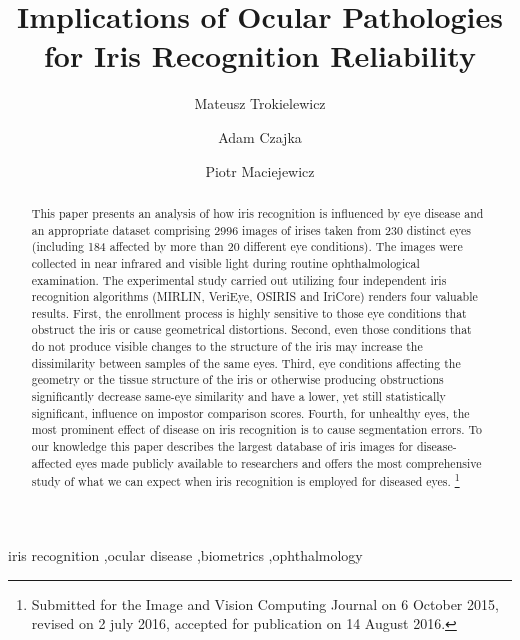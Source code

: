 \documentclass[article,12pt]{elsarticle}
\begin{document}
\begin{frontmatter}


\title{Implications of Ocular Pathologies \\for Iris Recognition Reliability}

\author[addressNASK,addressPW]{Mateusz Trokielewicz}

\author[addressNASK,addressPW]{Adam Czajka}

\author[addressWUM]{Piotr Maciejewicz}

\address[addressNASK]{Biometrics Laboratory, Research and Academic Computer Network (NASK)\\Kolska 12, 01-045 Warsaw, Poland}
\address[addressPW]{Institute of Control and Computation Engineering, Warsaw University of Technology\\Nowowiejska 15/19, 00-665 Warsaw, Poland}
\address[addressWUM]{Department of Ophthalmology, Medical University of Warsaw\\Lindleya 4, 02-005 Warsaw, Poland}



\begin{abstract} 
This paper presents an analysis of how iris recognition is influenced by eye disease and an appropriate dataset comprising 2996 images of irises taken from 230 distinct eyes (including 184 affected by more than 20 different eye conditions). The images were collected in near infrared and visible light during routine ophthalmological examination. The experimental study carried out utilizing four independent iris recognition algorithms (MIRLIN, VeriEye, OSIRIS and IriCore) renders four valuable results. First, the enrollment process is highly sensitive to those eye conditions that obstruct the iris or cause geometrical distortions. Second, even those conditions that do not produce visible changes to the structure of the iris may increase the dissimilarity between samples of the same eyes. Third, eye conditions affecting the geometry or the tissue structure of the iris or otherwise producing obstructions significantly decrease same-eye similarity and have a lower, yet still statistically significant, influence on impostor comparison scores. Fourth, for unhealthy eyes, the most prominent effect of disease on iris recognition is to cause segmentation errors. To our knowledge this paper describes the largest database of iris images for disease-affected eyes made publicly available to researchers and offers the most comprehensive study of what we can expect when iris recognition is employed for diseased eyes.
\let\thefootnote\relax\footnote{Submitted for the Image and Vision Computing Journal on 6 October 2015, revised on 2 july 2016, accepted for publication on 14 August 2016.}
\end{abstract}

\begin{keyword}
iris recognition \sep ocular disease \sep biometrics \sep ophthalmology
\end{keyword}

\end{frontmatter}
\end{document}
